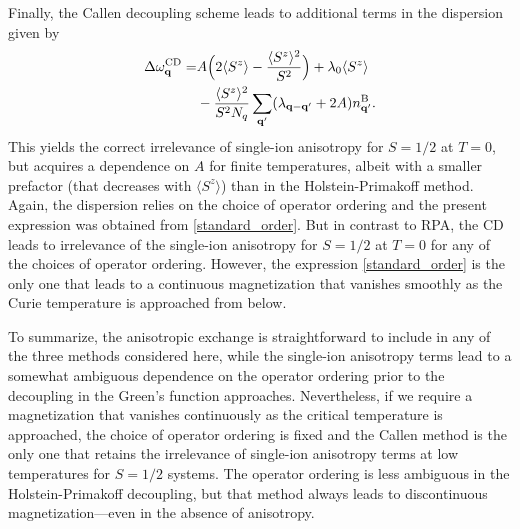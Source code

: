 \documentclass[aps,prb,reprint,floatfix,superscriptaddress]{revtex4-2}
\begin{document}
Finally, the Callen decoupling scheme leads to additional terms in the dispersion given by
\begin{align}\label{callen_correction}
    \Delta\omega^\mathrm{CD}_\mathbf{q}=&A\Big(2\langle S^z\rangle-\frac{\langle S^z\rangle^2}{S^2}\Big)+\lambda_0\langle S^z\rangle\notag\\&-\frac{\langle S^z\rangle^2}{S^2N_q}\sum_{\mathbf{q}'}(\lambda_\mathbf{q-q'}+2A)n^\mathrm{B}_{\mathbf{q}'}.
\end{align}
This yields the correct irrelevance of single-ion anisotropy for $S=1/2$ at $T=0$, but acquires a dependence on $A$ for finite temperatures, albeit with a smaller prefactor (that decreases with $\langle S^z\rangle$) than in the Holstein-Primakoff method. Again, the dispersion relies on the choice of operator ordering and the present expression was obtained from \eqref{standard_order}. But in contrast to RPA, the CD leads to irrelevance of the single-ion anisotropy for $S=1/2$ at $T=0$ for any of the choices of operator ordering. However, the expression \eqref{standard_order} is the only one that leads to a continuous magnetization that vanishes smoothly as the Curie temperature is approached from below.

To summarize, the anisotropic exchange is straightforward to include in any of the three methods considered here, while the single-ion anisotropy terms lead to a somewhat ambiguous dependence on the operator ordering prior to the decoupling in the Green's function approaches. Nevertheless, if we require a magnetization that vanishes continuously as the critical temperature is approached, the choice of operator ordering is fixed and the Callen method is the only one that retains the irrelevance of single-ion anisotropy terms at low temperatures for $S=1/2$ systems. The operator ordering is less ambiguous in the Holstein-Primakoff decoupling, but that method always leads to discontinuous magnetization---even in the absence of anisotropy.
\end{document}
